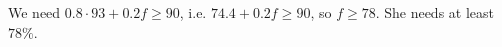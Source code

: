 We need $0.8\cdot93+0.2f\ge90$, i.e. $74.4+0.2f\ge90$, so $f\ge78$. She needs at least $\boxed{78\%}$.
